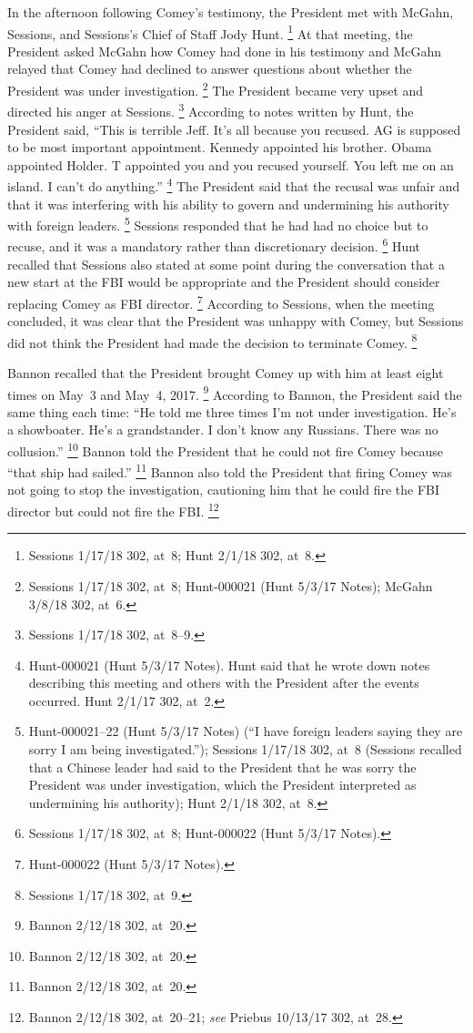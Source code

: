 In the afternoon following Comey's testimony, the President met with McGahn, Sessions, and Sessions's Chief of Staff Jody Hunt.%
\footnote{Sessions 1/17/18 302, at~8;
Hunt 2/1/18 302, at~8.}
At that meeting, the President asked McGahn how Comey had done in his testimony and McGahn relayed that Comey had declined to answer questions about whether the President was under investigation.%
\footnote{Sessions 1/17/18 302, at~8;
Hunt-000021 (Hunt 5/3/17 Notes);
McGahn 3/8/18 302, at~6.}
The President became very upset and directed his anger at Sessions.%
\footnote{Sessions 1/17/18 302, at~8--9.}
According to notes written by Hunt, the President said, ``This is terrible Jeff.
It's all because you recused.
AG is supposed to be most important appointment.
Kennedy appointed his brother.
Obama appointed Holder. T appointed you and you recused yourself.
You left me on an island.
I can't do anything.''%
\footnote{Hunt-000021 (Hunt 5/3/17 Notes).
Hunt said that he wrote down notes describing this meeting and others with the President after the events occurred.
Hunt 2/1/17 302, at~2.}
The President said that the recusal was unfair and that it was interfering with his ability to govern and undermining his authority with foreign leaders.%
\footnote{Hunt-000021--22 (Hunt 5/3/17 Notes) (``I have foreign leaders saying they are sorry I am being investigated.'');
Sessions 1/17/18 302, at~8 (Sessions recalled that a Chinese leader had said to the President that he was sorry the President was under investigation, which the President interpreted as undermining his authority);
Hunt 2/1/18 302, at~8.}
Sessions responded that he had had no choice but to recuse, and it was a mandatory rather than discretionary decision.%
\footnote{Sessions 1/17/18 302, at~8;
Hunt-000022 (Hunt 5/3/17 Notes).}
Hunt recalled that Sessions also stated at some point during the conversation that a new start at the FBI would be appropriate and the President should consider replacing Comey as FBI director.%
\footnote{Hunt-000022 (Hunt 5/3/17 Notes).}
According to Sessions, when the meeting concluded, it was clear that the President was unhappy with Comey, but Sessions did not think the President had made the decision to terminate Comey.%
\footnote{Sessions 1/17/18 302, at~9.}

Bannon recalled that the President brought Comey up with him at least eight times on May~3 and May~4, 2017.%
\footnote{Bannon 2/12/18 302, at~20.}
According to Bannon, the President said the same thing each time:
``He told me three times I'm not under investigation.
He's a showboater.
He's a grandstander.
I don't know any Russians.
There was no collusion.''%
\footnote{Bannon 2/12/18 302, at~20.}
Bannon told the President that he could not fire Comey because ``that ship had sailed.''%
\footnote{Bannon 2/12/18 302, at~20.}
Bannon also told the President that firing Comey was not going to stop the investigation, cautioning him that he could fire the FBI director but could not fire the FBI\null.%
\footnote{Bannon 2/12/18 302, at~20--21;
\textit{see} Priebus 10/13/17 302, at~28.}

